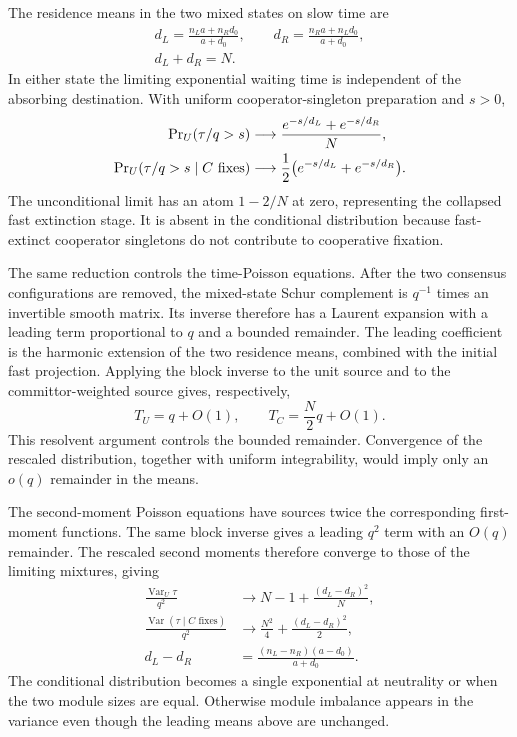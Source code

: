 \documentclass[aps,pre,reprint,amsmath,amssymb,longbibliography]{revtex4-2}
\begin{document}
The residence means in the two mixed states on slow time are
\begin{equation}
 \begin{gathered}
 d_L=\frac{n_La+n_Rd_0}{a+d_0},\qquad
 d_R=\frac{n_Ra+n_Ld_0}{a+d_0},\\
 d_L+d_R=N.
 \end{gathered}
 \label{app:path-general-residence}
\end{equation}
In either state the limiting exponential waiting time is independent
of the absorbing destination. With uniform cooperator-singleton
preparation and $s>0$, 
\begin{align}
 \Pr\nolimits_U(\tau/q>s)&\longrightarrow
 \frac{e^{-s/d_L}+e^{-s/d_R}}{N},\notag\\
 \Pr\nolimits_U(\tau/q>s\mid C\text{ fixes})&\longrightarrow
 \frac12\bigl(e^{-s/d_L}+e^{-s/d_R}\bigr).
 \label{app:path-general-time-mixtures}
\end{align}
The unconditional limit has an atom $1-2/N$ at zero, representing the
collapsed fast extinction stage. It is absent in the conditional distribution
because fast-extinct cooperator singletons do not contribute to
cooperative fixation.

The same reduction controls the time-Poisson equations. After the two
consensus configurations are removed, the mixed-state Schur complement
is $q^{-1}$ times an invertible smooth matrix. Its inverse therefore
has a Laurent expansion with a leading term proportional to $q$ and
a bounded remainder. The leading coefficient is the harmonic extension
of the two residence means, combined with the initial fast projection.
Applying the block inverse to the unit source and to the committor-weighted
source gives, respectively,
\begin{equation}
 T_U=q+O(1),\qquad T_C=\frac N2q+O(1).
 \label{app:path-general-mean-times}
\end{equation}
This resolvent argument controls the bounded remainder. Convergence
of the rescaled distribution, together with uniform integrability,
would imply only an $o(q)$  remainder in the means.

The second-moment Poisson equations have sources twice the corresponding
first-moment functions. The same block inverse gives a leading $q^2$
term with an $O(q)$ remainder. The rescaled second moments therefore
converge to those of the limiting mixtures, giving
\begin{equation}
 \begin{aligned}
 \frac{\operatorname{Var}_U\tau}{q^2}&\longrightarrow
 N-1+\frac{(d_L-d_R)^2}{N},\\
 \frac{\operatorname{Var}(\tau\mid C\text{ fixes})}{q^2}
 &\longrightarrow\frac{N^2}{4}+\frac{(d_L-d_R)^2}{2},\\
 d_L-d_R&=\frac{(n_L-n_R)(a-d_0)}{a+d_0}.
 \end{aligned}
 \label{app:path-general-variances}
\end{equation}
The conditional distribution becomes a single exponential at neutrality
or when the two module sizes are equal. Otherwise module imbalance
appears in the variance even though the leading means above are unchanged.
\end{document}
